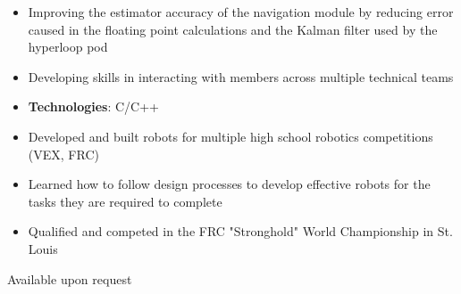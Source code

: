 \documentclass[10pt, letterpaper, ragged2e, withhyper]{altacv}
\begin{document}
\begin{paracol}{2}
    \divider
    
    \begin{itemize}
        \item Improving the estimator accuracy of the navigation module by reducing error caused in the floating point
        calculations and the Kalman filter used by the hyperloop pod
        \item Developing skills in interacting with members across multiple technical teams
        \item \textbf{Technologies}: C/C++
    \end{itemize}

    \begin{itemize}
        \item Developed and built robots for multiple high school robotics competitions (VEX, FRC)
        \item Learned how to follow design processes to develop effective robots for the tasks they are required to complete
        \item Qualified and competed in the FRC "Stronghold" World Championship in St. Louis 
    \end{itemize}

    Available upon request

\end{paracol}
\end{document}
